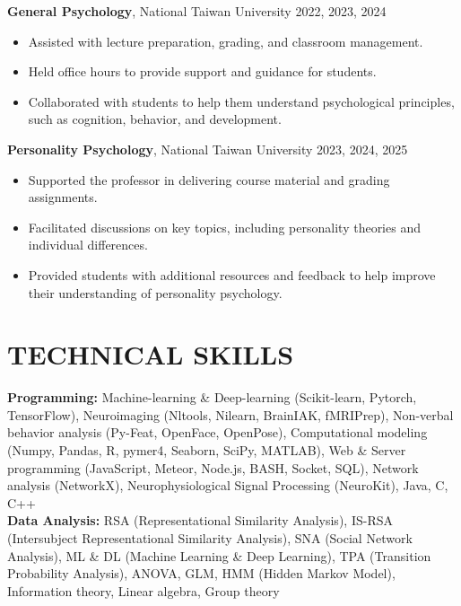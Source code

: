 \documentclass[a4paper,12pt]{article}
\newcommand{\itemspace}{7pt} %
\begin{document}
\noindent\textbf{General Psychology}, National Taiwan University  \hfill 2022, 2023, 2024
\begin{itemize}
    \item Assisted with lecture preparation, grading, and classroom management.
    \item Held office hours to provide support and guidance for students.
    \item Collaborated with students to help them understand psychological principles, such as cognition, behavior, and development.
\end{itemize}

\noindent\textbf{Personality Psychology}, National Taiwan University \hfill 2023, 2024, 2025
\begin{itemize}
    \item Supported the professor in delivering course material and grading assignments.
    \item Facilitated discussions on key topics, including personality theories and individual differences.
    \item Provided students with additional resources and feedback to help improve their understanding of personality psychology.
\end{itemize}

\vspace{7pt}

\section*{TECHNICAL SKILLS}
\textbf{Programming:} Machine-learning \& Deep-learning (Scikit-learn, Pytorch, TensorFlow), Neuroimaging (Nltools, Nilearn, BrainIAK, fMRIPrep), Non-verbal behavior analysis (Py-Feat, OpenFace, OpenPose), Computational modeling (Numpy, Pandas, R, pymer4, Seaborn, SciPy, MATLAB), Web \& Server programming (JavaScript, Meteor, Node.js, BASH, Socket, SQL), Network analysis (NetworkX), Neurophysiological Signal Processing (NeuroKit), Java, C, C++ \\[\itemspace]
\noindent\textbf{Data Analysis:} RSA (Representational Similarity Analysis), IS-RSA (Intersubject Representational Similarity Analysis), SNA (Social Network Analysis), ML \& DL (Machine Learning \& Deep Learning), TPA (Transition Probability Analysis), ANOVA, GLM, HMM (Hidden Markov Model), Information theory, Linear algebra, Group theory

\thispagestyle{lastupdate}
\end{document}
